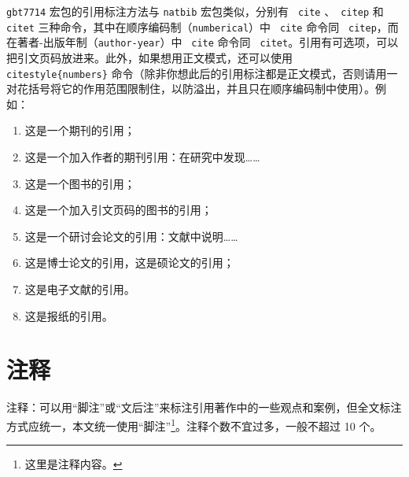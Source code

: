 \texttt{gbt7714} 宏包的引用标注方法与 \texttt{natbib} 宏包类似，分别有 \texttt{ cite} 、\texttt{ citep} 和 \texttt{ citet} 三种命令，其中在顺序编码制（\texttt{numberical}）中 \texttt{ cite} 命令同 \texttt{ citep}，而在著者-出版年制（\texttt{author-year}）中 \texttt{ cite} 命令同 \texttt{ citet}。引用有可选项，可以把引文页码放进来。此外，如果想用正文模式，还可以使用 \texttt{ citestyle\{numbers\}} 命令（除非你想此后的引用标注都是正文模式，否则请用一对花括号将它的作用范围限制住，以防溢出，并且只在顺序编码制中使用）。例如：
\begin{enumerate}
    \item 这是一个期刊的引用\cite{LIGOScientific:2017zic}；
    \item 这是一个加入作者的期刊引用：\citet{ZhaoWen:2017twxjz}在研究中发现……
    \item 这是一个图书的引用\cite{Rubakov:2017xzr}；
    \item 这是一个加入引文页码的图书的引用\cite[92]{Zhang:2021}；
    \item 这是一个研讨会论文的引用：文献{\cite{Tanikawa:2021+x}}中说明……
    \item 这是博士论文的引用\citep{Migenda:2019xbm,HuangGuoYuan:2020}，这是硕论文的引用\citep{Shojaeifar:2015csv,SongRen:2020}；
    \item 这是电子文献的引用\citep{Piro:2021oaa,bilibili:read}。
    \item 这是报纸的引用\citep{Li:2005}。
\end{enumerate}

\section{注释}

注释：可以用“脚注”或“文后注”来标注引用著作中的一些观点和案例，但全文标注方式应统一，本文统一使用“脚注”\footnote{这里是注释内容。}。注释个数不宜过多，一般不超过 10 个。